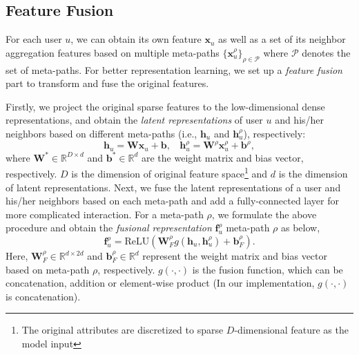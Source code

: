 \subsection{Feature Fusion}
For each user $u$, we can obtain its own feature $\mathbf{x}_u$ as well as a set of its neighbor aggregation features based on multiple meta-paths $\{\mathbf{x}^{\rho}_u\}_{\rho \in \mathcal{P}}$ where $\mathcal{P}$ denotes the set of meta-paths. For better representation learning, we set up a \emph{feature fusion} part to  transform and fuse the original features. 

Firstly, we project the original sparse features to the low-dimensional dense representations, and obtain the \emph{latent representations} of user $u$ and his/her neighbors based on different meta-paths (i.e., $\mathbf{h}_u$ and $\mathbf{h}_u^\rho$), respectively: %
\begin{equation}
\mathbf{h}_u = \mathbf{W}\mathbf{x}_u + \mathbf{b}, \ \ \ \ \mathbf{h}^{\rho}_u = \mathbf{W}^{\rho}\mathbf{x}^{\rho}_u + \mathbf{b}^{\rho},
\end{equation}
where $\mathbf{W}^* \in \mathbb{R}^{D \times d}$ and $\mathbf{b}^* \in \mathbb{R}^{d}$ are the weight matrix and bias vector, respectively. $D$ is the dimension of original feature space\footnote{The original attributes are discretized to sparse  $D$-dimensional feature as the model input} and $d$ is the dimension of latent representations. Next, we fuse the latent representations of a user and his/her neighbors based on each meta-path and add a fully-connected layer for more complicated interaction. For a meta-path $\rho$, we formulate the above procedure and obtain the \emph{fusional representation} $\mathbf{f}_u^{\rho}$ \wrt meta-path $\rho$ as below,
\begin{equation}
\mathbf{f}^{\rho}_u =\text{ReLU}(\mathbf{W}_{F}^{\rho}g(\mathbf{h}_u, \mathbf{h}^{\rho}_u) + \mathbf{b}^{\rho}_F).
\end{equation}
Here, $\textbf{W}_F^{\rho} \in \mathbb{R}^{d \times 2d}$ and $\mathbf{b}^{\rho}_F \in \mathbb{R}^{d}$ represent the weight matrix and bias vector based on meta-path $\rho$, respectively. $g(\cdot , \cdot)$ is the fusion function, which can be concatenation, addition or element-wise product (In our implementation, $g(\cdot , \cdot)$ is concatenation).

